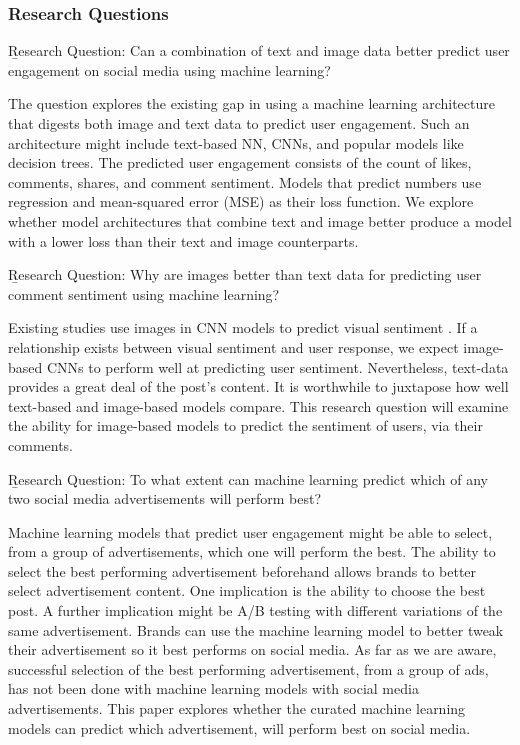 \documentclass[mksc,blindrev]{informs3} %
\begin{document}
\subsubsection{Research Questions}
\b{Research Question:} Can a combination of text and image data better predict user engagement on social media using machine learning?


The question explores the existing gap in using a machine learning architecture that digests both image and text data to predict user engagement. Such an architecture might include text-based NN, CNNs, and popular models like decision trees. The predicted user engagement consists of the count of likes, comments, shares, and comment sentiment. Models that predict numbers use regression and mean-squared error (MSE) as their loss function. We explore whether model architectures that combine text and image better produce a model with a lower loss than their text and image counterparts. 

\b{Research Question:} Why are images better than text data for predicting user comment sentiment using machine learning?


Existing studies use images in CNN models to predict visual sentiment \cite{Segalin2017, Xu2014}. If a relationship exists between visual sentiment and user response, we expect image-based CNNs to perform well at predicting user sentiment. Nevertheless, text-data provides a great deal of the post's content. It is worthwhile to juxtapose how well text-based and image-based models compare. This research question will examine the ability for image-based models to predict the sentiment of users, via their comments.

\b{Research Question:} To what extent can machine learning predict which of any two social media advertisements will perform best?


Machine learning models that predict user engagement might be able to select, from a group of advertisements, which one will perform the best. The ability to select the best performing advertisement beforehand allows brands to better select advertisement content. One implication is the ability to choose the best post. A further implication might be A/B testing with different variations of the same advertisement. Brands can use the machine learning model to better tweak their advertisement so it best performs on social media. As far as we are aware, successful selection of the best performing advertisement, from a group of ads, has not been done with machine learning models with social media advertisements. This paper explores whether the curated machine learning models can predict which advertisement, will perform best on social media.
\end{document}
